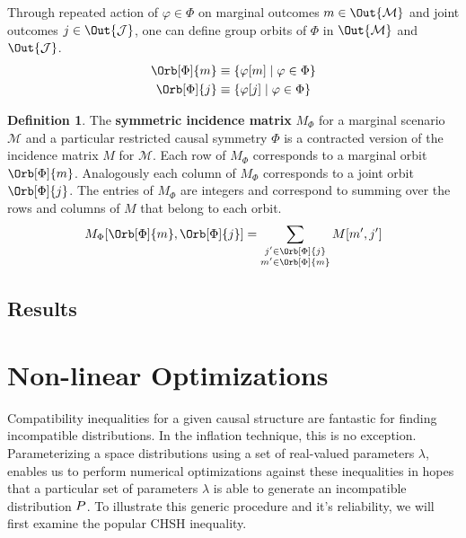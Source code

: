 \documentclass[aps, 10pt, english, twoside, pra, nofootinbib, longbibliography]{revtex4-1}
\theoremstyle{plain}
\theoremstyle{definition}
\newtheorem{definition}[theorem]{Definition}
\theoremstyle{remark}
\newcommand{\gep}{\varphi}
\newcommand{\gp}{\Phi}
\newcommand{\mscenario}{\mathcal{M}}
\newcommand{\jointvar}{\mathcal{J}}
\newcommand{\term}[1]{\textcolor{Mahogany}{\textbf{#1}}}
\begin{document}
    Through repeated action of $\gep \in \gp$ on marginal outcomes $m \in \Out{\mscenario}$ and joint outcomes $j \in \Out{\jointvar}$, one can define group orbits of $\gp$ in $\Out{\mscenario}$ and $\Out{\jointvar}$.
    \begin{align*}
        \Orb[\gp]{m} &\defined \bc{\gep\bs{m} \mid \gep \in \gp} \\
        \Orb[\gp]{j} &\defined \bc{\gep\bs{j} \mid \gep \in \gp}
    \end{align*}

    \begin{definition}
        The \term{symmetric incidence matrix} $M_{\gp}$ for a marginal scenario $\mscenario$ and a particular restricted causal symmetry $\gp$ is a contracted version of the incidence matrix $M$ for $\mscenario$. Each row of $M_{\gp}$ corresponds to a marginal orbit $\Orb[\gp]{m}$. Analogously each column of $M_{\gp}$ corresponds to a joint orbit $\Orb[\gp]{j}$. The entries of $M_{\gp}$ are integers and correspond to summing over the rows and columns of $M$ that belong to each orbit.
        \[ M_{\gp}\bs{\Orb[\gp]{m}, \Orb[\gp]{j}} = \sum_{\substack{j' \in \Orb[\gp]{j} \\ m' \in \Orb[\gp]{m}}} M\bs{m',j'} \]
    \end{definition}

    \subsection{Results}


    \section{Non-linear Optimizations}
    \label{sec:optimizations}
    Compatibility inequalities for a given causal structure are fantastic for finding incompatible distributions. In the inflation technique, this is no exception. Parameterizing a space distributions using a set of real-valued parameters $\lambda$, enables us to perform numerical optimizations against these inequalities in hopes that a particular set of parameters $\lambda$ is able to generate an incompatible distribution $\prob$. To illustrate this generic procedure and it's reliability, we will first examine the popular CHSH inequality.
\end{document}

